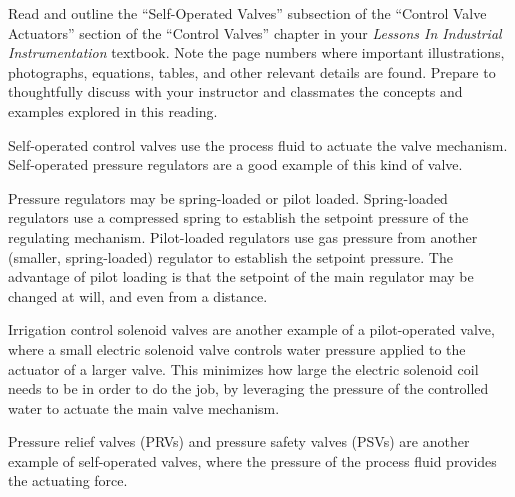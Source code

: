 

Read and outline the ``Self-Operated Valves'' subsection of the ``Control Valve Actuators'' section of the ``Control Valves'' chapter in your {\it Lessons In Industrial Instrumentation} textbook.  Note the page numbers where important illustrations, photographs, equations, tables, and other relevant details are found.  Prepare to thoughtfully discuss with your instructor and classmates the concepts and examples explored in this reading.














Self-operated control valves use the process fluid to actuate the valve mechanism.  Self-operated pressure regulators are a good example of this kind of valve.

\vskip 10pt

Pressure regulators may be spring-loaded or pilot loaded.  Spring-loaded regulators use a compressed spring to establish the setpoint pressure of the regulating mechanism.  Pilot-loaded regulators use gas pressure from another (smaller, spring-loaded) regulator to establish the setpoint pressure.  The advantage of pilot loading is that the setpoint of the main regulator may be changed at will, and even from a distance.

\vskip 10pt

Irrigation control solenoid valves are another example of a pilot-operated valve, where a small electric solenoid valve controls water pressure applied to the actuator of a larger valve.  This minimizes how large the electric solenoid coil needs to be in order to do the job, by leveraging the pressure of the controlled water to actuate the main valve mechanism.

\vskip 10pt

Pressure relief valves (PRVs) and pressure safety valves (PSVs) are another example of self-operated valves, where the pressure of the process fluid provides the actuating force.




